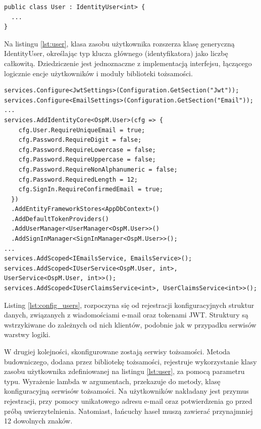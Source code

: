\begin{lstlisting}[language=CSharp, caption={Klasa zasobu użytkownika systemu}, label=lst:user]
public class User : IdentityUser<int> {
  ...
}
\end{lstlisting}

Na listingu \ref{lst:user}, klasa zasobu użytkownika rozszerza klasę generyczną IdentityUser, określając typ klucza głównego (identyfikatora) jako liczbę całkowitą. Dziedziczenie jest jednoznaczne z implementacją interfejsu, łączącego logicznie encje użytkowników i moduły biblioteki tożsamości.

\begin{lstlisting}[language=CSharp, caption={Konfiguracja serwisów związanych z użytkownikami w metodzie Startup.ConfigureServices()}, label=lst:config_users]
services.Configure<JwtSettings>(Configuration.GetSection("Jwt"));
services.Configure<EmailSettings>(Configuration.GetSection("Email"));
...
services.AddIdentityCore<OspM.User>(cfg => {
    cfg.User.RequireUniqueEmail = true;
    cfg.Password.RequireDigit = false;
    cfg.Password.RequireLowercase = false;
    cfg.Password.RequireUppercase = false;
    cfg.Password.RequireNonAlphanumeric = false;
    cfg.Password.RequiredLength = 12;
    cfg.SignIn.RequireConfirmedEmail = true;
  })
  .AddEntityFrameworkStores<AppDbContext>()
  .AddDefaultTokenProviders()
  .AddUserManager<UserManager<OspM.User>>()
  .AddSignInManager<SignInManager<OspM.User>>();
...
services.AddScoped<IEmailsService, EmailsService>();
services.AddScoped<IUserService<OspM.User, int>, UserService<OspM.User, int>>();
services.AddScoped<IUserClaimsService<int>, UserClaimsService<int>>();
\end{lstlisting}

Listing \ref{lst:config_users}, rozpoczyna się od rejestracji konfiguracyjnych struktur danych, związanych z wiadomościami e-mail oraz tokenami JWT. Struktury są wstrzykiwane do zależnych od nich klientów, podobnie jak w przypadku serwisów warstwy logiki.

W drugiej kolejności, skonfigurowane zostają serwisy tożsamości. Metoda budowniczego, dodana przez bibliotekę tożsamości, rejestruje wykorzystanie klasy zasobu użytkownika zdefiniowanej na listingu \ref{lst:user}, za pomocą parametru typu. Wyrażenie lambda w argumentach, przekazuje do metody, klasę konfiguracyjną serwisów tożsamości. Na użytkowników nakładany jest przymus rejestracji, przy pomocy unikatowego adresu e-mail oraz potwierdzenia go przed próbą uwierzytelnienia. Natomiast, łańcuchy haseł muszą zawierać przynajmniej 12 dowolnych znaków.

